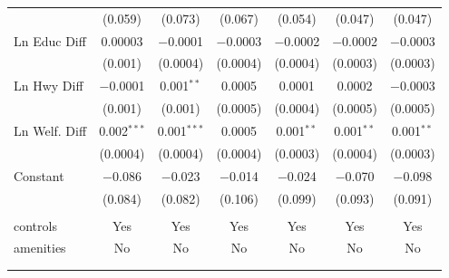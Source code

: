 \begin{table}[!htbp]
\begin{tabular}{@{\extracolsep{5pt}}lcccccc}
  & (0.059) & (0.073) & (0.067) & (0.054) & (0.047) & (0.047) \\ 
  Ln Educ Diff & 0.00003 & $-$0.0001 & $-$0.0003 & $-$0.0002 & $-$0.0002 & $-$0.0003 \\ 
  & (0.001) & (0.0004) & (0.0004) & (0.0004) & (0.0003) & (0.0003) \\ 
  Ln Hwy Diff & $-$0.0001 & 0.001$^{**}$ & 0.0005 & 0.0001 & 0.0002 & $-$0.0003 \\ 
  & (0.001) & (0.001) & (0.0005) & (0.0004) & (0.0005) & (0.0005) \\ 
  Ln Welf. Diff & 0.002$^{***}$ & 0.001$^{***}$ & 0.0005 & 0.001$^{**}$ & 0.001$^{**}$ & 0.001$^{**}$ \\ 
  & (0.0004) & (0.0004) & (0.0004) & (0.0003) & (0.0004) & (0.0003) \\ 
  Constant & $-$0.086 & $-$0.023 & $-$0.014 & $-$0.024 & $-$0.070 & $-$0.098 \\ 
  & (0.084) & (0.082) & (0.106) & (0.099) & (0.093) & (0.091) \\ 
 \hline \\[-1.8ex] 
controls & Yes & Yes & Yes & Yes & Yes & Yes \\ 
amenities & No & No & No & No & No & No \\ 
\hline \\[-1.8ex] 
\hline 
\hline \\[-1.8ex] 
\end{tabular} 
\end{table} 
